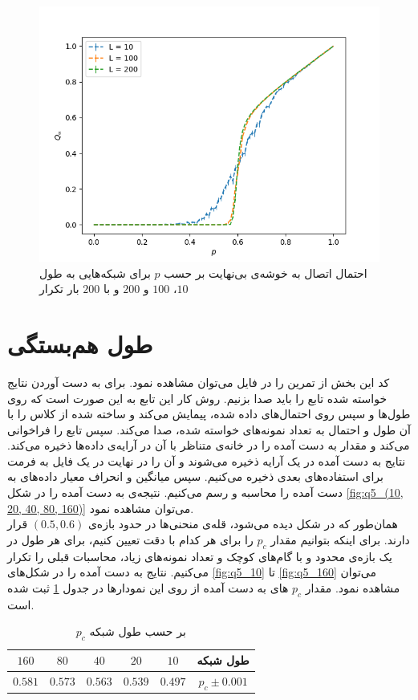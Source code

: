 \documentclass[11pt, a4paper]{article}
\begin{document}
\begin{figure}[h]
  \centering
  \includegraphics[width=.7\textwidth]{q4_0.01_200_(10, 100, 200).png}
  \caption{احتمال اتصال به خوشه‌ی بی‌نهایت بر حسب $p$ برای شبکه‌هایی به طول $10$، $100$ و $200$ و با $200$ بار تکرار}
  \label{fig:q4_0.05_100_(10, 100, 200)}
\end{figure}


\section{\textbf{طول هم‌بستگی}}
کد این بخش از تمرین را در فایل
می‌توان مشاهده نمود.
برای به دست‌ آوردن نتایج خواسته شده تابع
را باید صدا بزنیم.
روش کار این تابع به این صورت است که روی طول‌ها و سپس روی احتمال‌های داده شده،
پیمایش می‌کند و
ساخته شده از کلاس
را با آن طول و احتمال به تعداد نمونه‌های خواسته شده، صدا می‌کند.
سپس تابع
را فراخوانی می‌کند و مقدار به دست آمده را در خانه‌ی متناظر با آن در آرایه‌ی داده‌ها ذخیره می‌کند.
نتایج به دست آمده در یک آرایه ذخیره می‌شوند و آن را در نهایت در یک فایل به فرمت
برای استفاده‌های بعدی ذخیره می‌کنیم.
سپس میانگین و انحراف معیار داده‌های به دست آمده را محاسبه و رسم می‌کنیم.
نتیجه‌ی به دست آمده را در شکل
\ref{fig:q5_(10, 20, 40, 80, 160)}
می‌توان مشاهده نمود.
\\
همان‌طور که در شکل دیده می‌شود، قله‌ی منحنی‌ها در حدود بازه‌ی
$(0.5, 0.6)$
قرار دارند.
برای اینکه بتوانیم مقدار
$p_c$
را برای هر کدام با دقت تعیین کنیم، برای هر طول در یک بازه‌ی محدود
و با گام‌های کوچک و تعداد نمونه‌های زیاد، محاسبات قبلی را تکرار می‌کنیم.
نتایج به دست آمده را در شکل‌های
\ref{fig:q5_10}
تا
\ref{fig:q5_160}
می‌توان مشاهده نمود.
مقدار
$p_c$
های به دست‌ آمده از روی این نمودار‌ها در جدول
\ref{tab:p_c_l}
ثبت شده است.

\begin{table}[h]
  \centering
  \begin{tabular}{|c|c|c|c|c|c|}
    \hline
    $160$ & $80$ & $40$ & $20$ & $10$ & طول شبکه \\
     \hline
    $0.581$ & $0.573$ & $0.563$ & $0.539$ & $0.497$ & $p_c \pm 0.001$ \\
     \hline
  \end{tabular}
  \caption{$p_c$ بر حسب طول شبکه}
  \label{tab:p_c_l}
\end{table}
\end{document}
